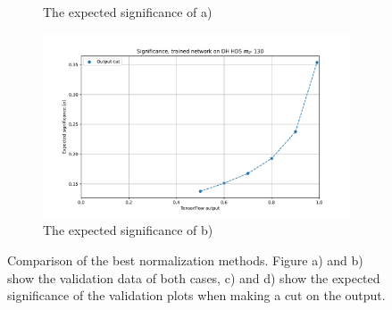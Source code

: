 \documentclass[14pt, a4paper]{book}
\begin{document}
\begin{figure}[!ht]
\begin{subfigure}[b]{0.49\textwidth}
      \caption{The expected significance of a)}
   \end{subfigure}
   \hfill
   \begin{subfigure}[b]{0.49\textwidth}
      \centering
      \includegraphics[width=1\textwidth]{Batch_norm/EXP_SIG.pdf}
      \caption{The expected significance of b)}
   \end{subfigure}
   \caption{Comparison of the best normalization methods. Figure a) and b) show the validation data of both cases, c) and d) show the expected significance of the validation plots when making a cut on the output. }\label{fig:BestNormie}
\end{figure}


\clearpage
\end{document}
